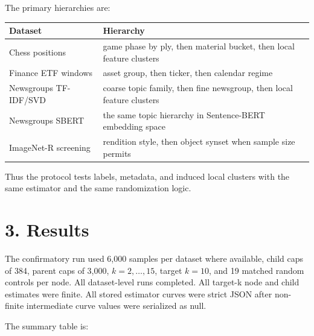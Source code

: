 \documentclass[11pt]{article}
\begin{document}
The primary hierarchies are:

\begin{longtable}[]{@{}
  >{\raggedright\arraybackslash}p{}
  >{\raggedright\arraybackslash}p{}@{}}
\toprule\noalign{}
\begin{minipage}[b]{\linewidth}\raggedright
Dataset
\end{minipage} & \begin{minipage}[b]{\linewidth}\raggedright
Hierarchy
\end{minipage} \\
\midrule\noalign{}
\endhead
\bottomrule\noalign{}
\endlastfoot
Chess positions & game phase by ply, then material bucket, then local feature clusters \\
Finance ETF windows & asset group, then ticker, then calendar regime \\
20 Newsgroups TF-IDF/SVD & coarse topic family, then fine newsgroup, then local feature clusters \\
20 Newsgroups SBERT & the same topic hierarchy in Sentence-BERT embedding space \\
ImageNet-R screening & rendition style, then object synset when sample size permits \\
\end{longtable}

Thus the protocol tests labels, metadata, and induced local clusters with the same estimator and the same randomization logic.

\section{3. Results}\label{results}

The confirmatory run used 6,000 samples per dataset where available, child caps of 384, parent caps of 3,000, \(k = 2,\ldots,15\), target \(k = 10\), and 19 matched random controls per node. All dataset-level runs completed. All target-k node and child estimates were finite. All stored estimator curves were strict JSON after non-finite intermediate curve values were serialized as null.

The summary table is:
\end{document}
